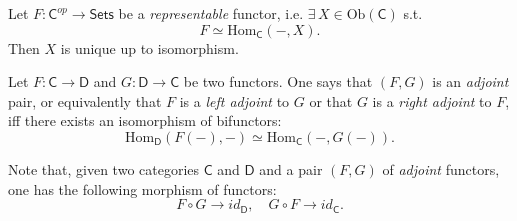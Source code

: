 \begin{prop}
	Let $F: \mathsf{C}^{op} \to \mathsf{Sets}$ be a {\em representable} functor, i.e. $\exists\, X \in \mathrm{Ob} \left(\mathsf{C}\right)$ s.t.
	\begin{equation}
	F \simeq \mathrm{Hom}_{\mathsf{C}} \left( -, X \right)
	.\end{equation} 
	Then $X$ is unique up to isomorphism.
\end{prop} 

\begin{defn}
	Let $F: \mathsf{C} \to \mathsf{D}$ and $G: \mathsf{D} \to \mathsf{C}$ be two functors.
	One says that $\left(F, G\right)$ is an {\em adjoint} pair, or equivalently that $F$ is a {\em left adjoint} to $G$ or that $G$ is a {\em right adjoint} to $F$,
	iff there exists an isomorphism of bifunctors:
	\begin{equation}
		\mathrm{Hom}_{\mathsf{D}} \left( F(-), - \right) \simeq
		\mathrm{Hom}_{\mathsf{C}} \left( -, G(-) \right)
	.\end{equation} 
\end{defn}

\begin{rem}
	Note that, given two categories $\mathsf{C}$ and $\mathsf{D}$ and a pair $\left(F, G\right)$ of {\em adjoint} functors, one has the following morphism of functors:
	\begin{equation}
	F \circ G \to id_\mathsf{D}, \quad G \circ F \to id_\mathsf{C}
	.\end{equation} 
\end{rem}
